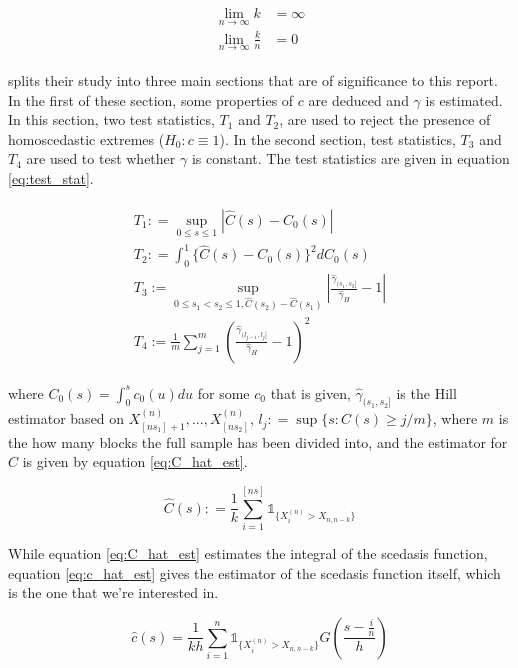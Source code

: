 \documentclass[a4paper]{article}
\begin{document}
\begin{align} \label{eq:k_cond}
\begin{split}
\lim_{n \rightarrow \infty} k &= \infty \\
\lim_{n \rightarrow \infty} \frac{k}{n} &= 0
\end{split}
\end{align}

\cite{einmahl16} splits their study into three main sections that are of significance to this report. In the first of these section, some properties of $c$ are deduced and $\gamma$ is estimated. In this section, two test statistics, $T_1$ and $T_2$, are used to reject the presence of homoscedastic extremes ($H_0: c \equiv 1$). In the second section, test statistics, $T_3$ and $T_4$ are used to test whether $\gamma$ is constant. The test statistics are given in equation \ref{eq:test_stat}.

\begin{align} \label{eq:test_stat}
\begin{split}
T_1 : = \sup_{0 \le s \le 1} |\hat{C}(s) - C_0(s)|\\
T_2 : = \int_0^1 \{\hat{C}(s) - C_0(s)\}^2 dC_0(s)\\
T_3 := \sup_{0 \le s_1 < s_2 \le 1, \hat{C}(s_2) - \hat{C}(s_1)}|\frac{\hat{\gamma}_{(s_1,s_2]}}{\hat{\gamma}_H} -1| \\
T_4 := \frac{1}{m} \sum_{j=1}^m (\frac{\hat{\gamma}_{(l_{j-1},l_j]}}{\hat{\gamma}_H}-1)^2
\end{split}
\end{align}

\noindent where $C_0(s) = \int_0^s c_0(u)du$ for some $c_0$ that is given, $\hat{\gamma}_{(s_1,s_2]}$ is the Hill estimator based on $X_{[ns_1]+1}^{(n)}, ... , X_{[ns_2]}^{(n)}$,  $l_j : = \sup\{s: \hat{C}(s) \ge j/m\}$, where $m$ is the how many blocks the full sample has been divided into, and the estimator for $C$ is given by equation \ref{eq:C_hat_est}.


\begin{equation} \label{eq:C_hat_est}
\hat{C}(s) : = \frac{1}{k} \sum_{i=1}^{[ns]} \mathbb{1}_{\{X_i^{(n)} > X_{n,n-k}\}}
\end{equation}

While equation \ref{eq:C_hat_est} estimates the integral of the scedasis function, equation \ref{eq:c_hat_est} gives the estimator of the scedasis function itself, which is the one that we're interested in.

\begin{equation} \label{eq:c_hat_est}
\hat{c}(s) = \frac{1}{kh} \sum_{i=1}^n \mathbb{1}_{\{X_i^{(n)} > X_{n,n-k}\}}G(\frac{s-\frac{i}{n}}{h})
\end{equation}
\end{document}
